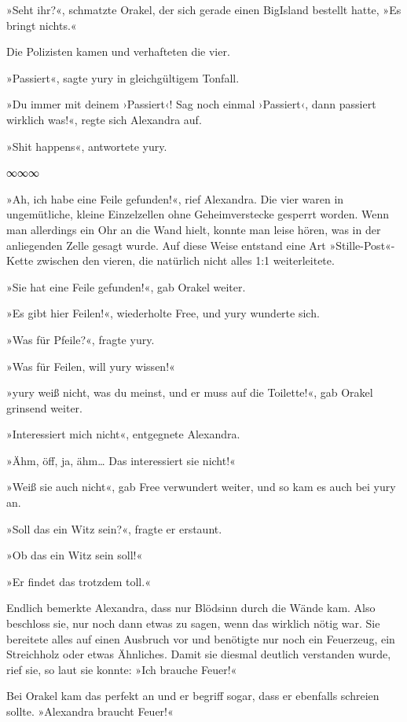 »Seht ihr?«, schmatzte Orakel, der sich gerade einen BigIsland bestellt hatte, »Es bringt nichts.«

Die Polizisten kamen und verhafteten die vier.

»Passiert«, sagte yury in gleichgültigem Tonfall.

»Du immer mit deinem ›Passiert‹! Sag noch einmal ›Passiert‹, dann passiert wirklich was!«, regte sich Alexandra auf.

»Shit happens«, antwortete yury.

\begin{center}
    ∞∞∞
\end{center}

»Ah, ich habe eine Feile gefunden!«, rief Alexandra. Die vier waren in ungemütliche, kleine Einzelzellen ohne Geheimverstecke gesperrt worden. Wenn man allerdings ein Ohr an die Wand hielt, konnte man leise hören, was in der anliegenden Zelle gesagt wurde. Auf diese Weise entstand eine Art »Stille-Post«-Kette zwischen den vieren, die natürlich nicht alles 1:1 weiterleitete.

»Sie hat eine Feile gefunden!«, gab Orakel weiter.

»Es gibt hier Feilen!«, wiederholte Free, und yury wunderte sich.

»Was für Pfeile?«, fragte yury.

»Was für Feilen, will yury wissen!«

»yury weiß nicht, was du meinst, und er muss auf die Toilette!«, gab Orakel grinsend weiter.

»Interessiert mich nicht«, entgegnete Alexandra.

»Ähm, öff, ja, ähm… Das interessiert sie nicht!«

»Weiß sie auch nicht«, gab Free verwundert weiter, und so kam es auch bei yury an.

»Soll das ein Witz sein?«, fragte er erstaunt.

»Ob das ein Witz sein soll!«

»Er findet das trotzdem toll.«

Endlich bemerkte Alexandra, dass nur Blödsinn durch die Wände kam. Also beschloss sie, nur noch dann etwas zu sagen, wenn das wirklich nötig war. Sie bereitete alles auf einen Ausbruch vor und benötigte nur noch ein Feuerzeug, ein Streichholz oder etwas Ähnliches. Damit sie diesmal deutlich verstanden wurde, rief sie, so laut sie konnte: »Ich brauche Feuer!«

Bei Orakel kam das perfekt an und er begriff sogar, dass er ebenfalls schreien sollte. »Alexandra braucht Feuer!«

